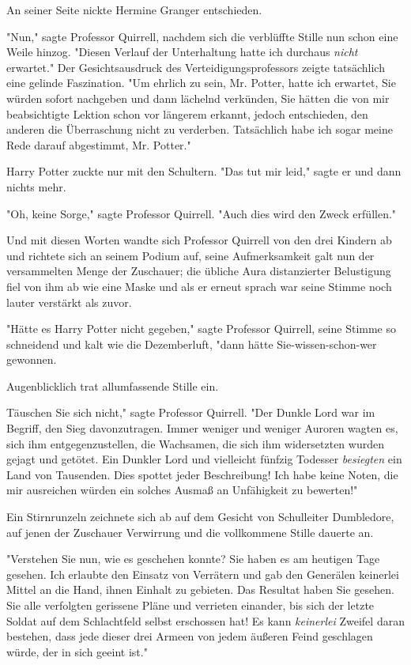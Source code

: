 {An seiner Seite nickte Hermine Granger entschieden.

"Nun," sagte Professor Quirrell, nachdem sich die verblüffte Stille nun schon eine Weile hinzog. "Diesen Verlauf der Unterhaltung hatte ich durchaus \emph{nicht} erwartet." Der Gesichtsausdruck des Verteidigungsprofessors zeigte tatsächlich eine gelinde Faszination. "Um ehrlich zu sein, Mr. Potter, hatte ich erwartet, Sie würden sofort nachgeben und dann lächelnd verkünden, Sie hätten die von mir beabsichtigte Lektion schon vor längerem erkannt, jedoch entschieden, den anderen die Überraschung nicht zu verderben. Tatsächlich habe ich sogar meine Rede darauf abgestimmt, Mr. Potter."

Harry Potter zuckte nur mit den Schultern. "Das tut mir leid," sagte er und dann nichts mehr.

"Oh, keine Sorge," sagte Professor Quirrell. "Auch dies wird den Zweck erfüllen."

Und mit diesen Worten wandte sich Professor Quirrell von den drei Kindern ab und richtete sich an seinem Podium auf, seine Aufmerksamkeit galt nun der versammelten Menge der Zuschauer; die übliche Aura distanzierter Belustigung fiel von ihm ab wie eine Maske und als er erneut sprach war seine Stimme noch lauter verstärkt als zuvor.

"Hätte es Harry Potter nicht gegeben," sagte Professor Quirrell, seine Stimme so schneidend und kalt wie die Dezemberluft, "dann hätte Sie-wissen-schon-wer gewonnen.

Augenblicklich trat allumfassende Stille ein.

\later

Täuschen Sie sich nicht," sagte Professor Quirrell. "Der Dunkle Lord war im Begriff, den Sieg davonzutragen. Immer weniger und weniger Auroren wagten es, sich ihm entgegenzustellen, die Wachsamen, die sich ihm widersetzten wurden gejagt und getötet. Ein Dunkler Lord und vielleicht fünfzig Todesser \emph{besiegten} ein Land von Tausenden. Dies spottet jeder Beschreibung! Ich habe keine Noten, die mir ausreichen würden ein solches Ausmaß an Unfähigkeit zu bewerten!"

Ein Stirnrunzeln zeichnete sich ab auf dem Gesicht von Schulleiter Dumbledore, auf jenen der Zuschauer Verwirrung und die vollkommene Stille dauerte an.

"Verstehen Sie nun, wie es geschehen konnte? Sie haben es am heutigen Tage gesehen. Ich erlaubte den Einsatz von Verrätern und gab den Generälen keinerlei Mittel an die Hand, ihnen Einhalt zu gebieten. Das Resultat haben Sie gesehen. Sie alle verfolgten gerissene Pläne und verrieten einander, bis sich der letzte Soldat auf dem Schlachtfeld selbst erschossen hat! Es kann \emph{keinerlei} Zweifel daran bestehen, dass jede dieser drei Armeen von jedem äußeren Feind geschlagen würde, der in sich geeint ist."

}
